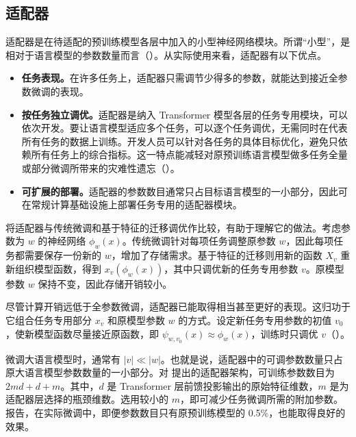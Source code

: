 \subsection{适配器}
\label{sec:ch04-adapters}
适配器是在待适配的预训练模型各层中加入的小型神经网络模块。所谓“小型”，是相对于语言模型的参数数量而言（）。从实际使用来看，适配器有以下优点。

\begin{itemize}
\item \textbf{任务表现。}在许多任务上，适配器只需调节少得多的参数，就能达到接近全参数微调的表现。
\item \textbf{按任务独立调优。}适配器是纳入 Transformer 模型各层的任务专用模块，可以依次开发。要让语言模型适应多个任务，可以逐个任务调优，无需同时在代表所有任务的数据上训练。开发人员可以针对各任务的具体目标优化，避免只依赖所有任务上的综合指标。这一特点能减轻对原预训练语言模型做多任务全量或部分微调所带来的灾难性遗忘（）。
\item \textbf{可扩展的部署。}适配器的参数数目通常只占目标语言模型的一小部分，因此可在常规计算基础设施上部署任务专用的适配器模块。
\end{itemize}

将适配器与传统微调和基于特征的迁移调优作比较，有助于理解它的做法。考虑参数为 $w$ 的神经网络 $\phi_w(x)$。传统微调针对每项任务调整原参数 $w$，因此每项任务都需要保存一份新的 $w$，增加了存储需求。基于特征的迁移则用新的函数 $X_v$ 重新组织模型函数，得到 $x_v(\phi_w(x))$，其中只调优新的任务专用参数 $v$。原模型参数 $w$ 保持不变，因此存储开销较小。

尽管计算开销远低于全参数微调，适配器已能取得相当甚至更好的表现。这归功于它组合任务专用部分 $x_v$ 和原模型参数 $w$ 的方式。设定新任务专用参数的初值 $v_0$，使新模型函数尽量接近原函数，即 $\psi_{w,v_0}(x)\approx\phi_w(x)$，训练时只调优 $v$（）。

微调大语言模型时，通常有 $|v|\ll|w|$。也就是说，适配器中的可调参数数量只占原大语言模型参数数量的一小部分。对 提出的适配器架构，可训练参数数目为 $2md+d+m$。其中，$d$ 是 Transformer 层前馈投影输出的原始特征维数，$m$ 是为适配器层选择的瓶颈维数。选用较小的 $m$，即可减少任务微调所需的附加参数。报告，在实际微调中，即便参数数目只有原预训练模型的 0.5\%，也能取得良好的效果。

